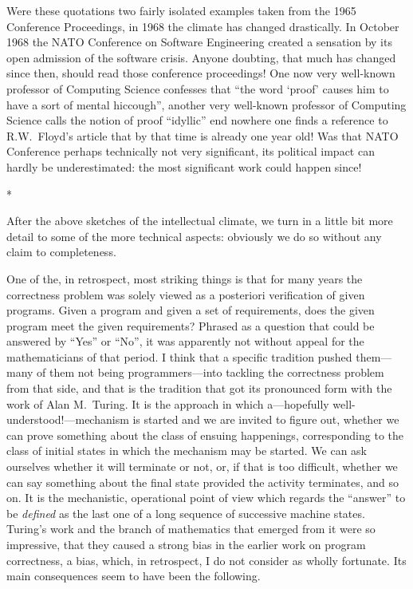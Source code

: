 \documentclass[12pt,letterpaper]{article}
\newcommand{\acro}[1]{{\small\MakeUppercase{#1}\spacefactor1000}}
\newcommand{\stardiv}{\medskip\centerline{*\qquad\raisebox{-1ex}{*}\qquad*}\medskip\noindent\ignorespaces}
\begin{document}
Were these quotations two fairly isolated examples taken from the 1965
Conference Proceedings, in 1968 the climate has changed drastically. In October
1968 the \acro{NATO} Conference on Software Engineering created a sensation by
its open admission of the software crisis. Anyone doubting, that much has
changed since then, should read those conference proceedings! One now very
well-known professor of Computing Science confesses that ``the word `proof'
causes him to have a sort of mental hiccough'', another very well-known
professor of Computing Science calls the notion of proof ``idyllic'' end
nowhere one finds a reference to R.W.~Floyd's article that by that time is
already one year old! Was that \acro{NATO} Conference perhaps technically not
very significant, its political impact can hardly be underestimated: the most
significant work could happen since! 

\stardiv

After the above sketches of the intellectual climate, we turn in a little bit more detail 
to some of the more technical aspects: obviously 
we do so without any claim to completeness. 

One of the, in retrospect, most striking things is that for many years the
correctness problem was solely viewed as a posteriori verification of given
programs. Given a program and given a set of requirements, does the given
program meet the given requirements? Phrased as a question that could be
answered by ``Yes'' or ``No'', it was apparently not without appeal for the
mathematicians of that period. I think that a specific tradition pushed
them---many of them not being programmers---into tackling the correctness
problem from that side, and that is the tradition that got its pronounced form
with the work of Alan M.~Turing. It is the approach in which a---hopefully
well-understood!---mechanism is started and we are invited to figure out,
whether we can prove something about the class of ensuing happenings,
corresponding to the class of initial states in which the mechanism may be
started. We can ask ourselves whether it will terminate or not, or, if that is
too difficult, whether we can say something about the final state provided the
activity terminates, and so on. It is the mechanistic, operational point of
view which regards the ``answer'' to be \emph{defined} as the last one of a
long sequence of successive machine states. Turing's work and the branch of
mathematics that emerged from it were so impressive, that they caused a strong
bias in the earlier work on program correctness, a bias, which, in retrospect,
I do not consider as wholly fortunate. Its main consequences seem to have been
the following. 
\end{document}
